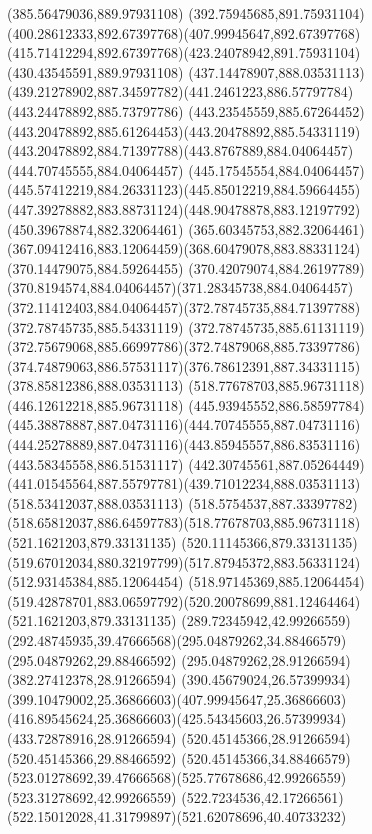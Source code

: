 {{		\lineto(385.56479036,889.97931108)
		\curveto(392.75945685,891.75931104)(400.28612333,892.67397768)(407.99945647,892.67397768)
		\curveto(415.71412294,892.67397768)(423.24078942,891.75931104)(430.43545591,889.97931108)
		\moveto(437.14478907,888.03531113)
		\curveto(439.21278902,887.34597782)(441.2461223,886.57797784)(443.24478892,885.73797786)
		\curveto(443.23545559,885.67264452)(443.20478892,885.61264453)(443.20478892,885.54331119)
		\curveto(443.20478892,884.71397788)(443.8767889,884.04064457)(444.70745555,884.04064457)
		\curveto(445.17545554,884.04064457)(445.57412219,884.26331123)(445.85012219,884.59664455)
		\curveto(447.39278882,883.88731124)(448.90478878,883.12197792)(450.39678874,882.32064461)
		\lineto(365.60345753,882.32064461)
		\curveto(367.09412416,883.12064459)(368.60479078,883.88331124)(370.14479075,884.59264455)
		\curveto(370.42079074,884.26197789)(370.8194574,884.04064457)(371.28345738,884.04064457)
		\curveto(372.11412403,884.04064457)(372.78745735,884.71397788)(372.78745735,885.54331119)
		\curveto(372.78745735,885.61131119)(372.75679068,885.66997786)(372.74879068,885.73397786)
		\curveto(374.74879063,886.57531117)(376.78612391,887.34331115)(378.85812386,888.03531113)
		\closepath
		\moveto(518.77678703,885.96731118)
		\lineto(446.12612218,885.96731118)
		\curveto(445.93945552,886.58597784)(445.38878887,887.04731116)(444.70745555,887.04731116)
		\curveto(444.25278889,887.04731116)(443.85945557,886.83531116)(443.58345558,886.51531117)
		\curveto(442.30745561,887.05264449)(441.01545564,887.55797781)(439.71012234,888.03531113)
		\lineto(518.53412037,888.03531113)
		\curveto(518.5754537,887.33397782)(518.65812037,886.64597783)(518.77678703,885.96731118)
		\moveto(521.1621203,879.33131135)
		\lineto(520.11145366,879.33131135)
		\curveto(519.67012034,880.32197799)(517.87945372,883.56331124)(512.93145384,885.12064454)
		\lineto(518.97145369,885.12064454)
		\curveto(519.42878701,883.06597792)(520.20078699,881.12464464)(521.1621203,879.33131135)
		\moveto(289.72345942,42.99266559)
		\curveto(292.48745935,39.47666568)(295.04879262,34.88466579)(295.04879262,29.88466592)
		\lineto(295.04879262,28.91266594)
		\lineto(382.27412378,28.91266594)
		\curveto(390.45679024,26.57399934)(399.10479002,25.36866603)(407.99945647,25.36866603)
		\curveto(416.89545624,25.36866603)(425.54345603,26.57399934)(433.72878916,28.91266594)
		\lineto(520.45145366,28.91266594)
		\lineto(520.45145366,29.88466592)
		\curveto(520.45145366,34.88466579)(523.01278692,39.47666568)(525.77678686,42.99266559)
		\lineto(523.31278692,42.99266559)
		\curveto(522.7234536,42.17266561)(522.15012028,41.31799897)(521.62078696,40.40733232)
}}
